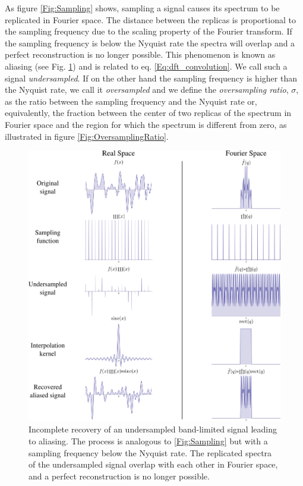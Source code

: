 As figure \ref{Fig:Sampling} shows, sampling a signal causes its spectrum to be
replicated in Fourier space. The distance between the replicas is proportional
to the sampling frequency due to the scaling property of the Fourier
transform. If the sampling frequency is below the Nyquist rate the spectra will
overlap and a perfect reconstruction is no longer possible. This phenomenon is known as
aliasing (see Fig. \ref{Fig:Undersampling}) and is related to eq. \ref{Eq:dft_convolution}. We call such a signal {\em undersampled}. If on the other hand
the sampling frequency is higher than the Nyquist rate, we call it {\em
  oversampled} and we define the {\em oversampling ratio}, $\sigma$, as the ratio between the
sampling frequency and the Nyquist rate or, equivalently, the fraction between
the center of two replicas of the spectrum in Fourier space and the region for
which the spectrum is different from zero, as illustrated in figure \ref{Fig:OversamplingRatio}.

\begin{figure}[h!]
  \centering
  \includegraphics[width=0.9 \columnwidth]{Fourier_Theory/Sampling3.png}
  \caption{Incomplete recovery of an undersampled band-limited signal leading to
    aliasing. The process is analogous to \ref{Fig:Sampling} but with a sampling
    frequency below the Nyquist rate. 
    The replicated spectra of the undersampled signal overlap with each other in
    Fourier space,
    and a perfect reconstruction is no longer possible.}
  \label{Fig:Undersampling}
\end{figure}

